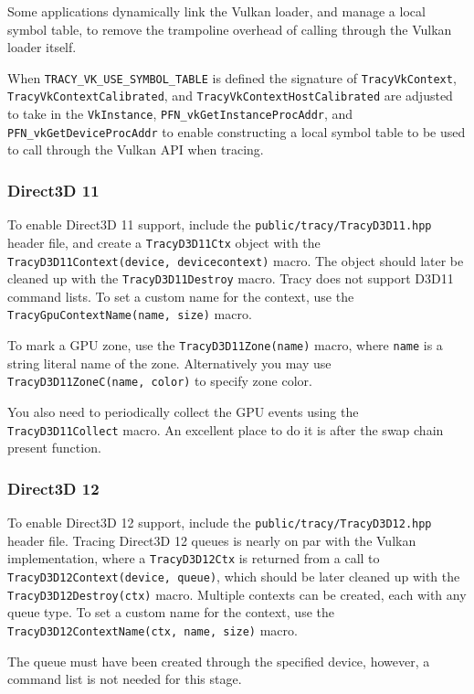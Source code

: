 \documentclass[hidelinks,titlepage,a4paper,twoside]{article}
\begin{document}
Some applications dynamically link the Vulkan loader, and manage a local symbol table, to remove the trampoline overhead of calling through the Vulkan loader itself.

When \texttt{TRACY\_VK\_USE\_SYMBOL\_TABLE} is defined the signature of \texttt{TracyVkContext}, \texttt{TracyVkContextCalibrated}, and \texttt{TracyVkContextHostCalibrated} are adjusted to take in the \texttt{VkInstance}, \texttt{PFN\_vkGetInstanceProcAddr}, and \texttt{PFN\_vkGetDeviceProcAddr} to enable constructing a local symbol table to be used to call through the Vulkan API when tracing.

\subsubsection{Direct3D 11}

To enable Direct3D 11 support, include the \texttt{public/tracy/TracyD3D11.hpp} header file, and create a \texttt{TracyD3D11Ctx} object with the \texttt{TracyD3D11Context(device, devicecontext)} macro. The object should later be cleaned up with the \texttt{TracyD3D11Destroy} macro. Tracy does not support D3D11 command lists. To set a custom name for the context, use the \texttt{TracyGpuContextName(name, size)} macro.

To mark a GPU zone, use the \texttt{TracyD3D11Zone(name)} macro, where \texttt{name} is a string literal name of the zone. Alternatively you may use \texttt{TracyD3D11ZoneC(name, color)} to specify zone color.

You also need to periodically collect the GPU events using the \texttt{TracyD3D11Collect} macro. An excellent place to do it is after the swap chain present function.

\subsubsection{Direct3D 12}

To enable Direct3D 12 support, include the \texttt{public/tracy/TracyD3D12.hpp} header file. Tracing Direct3D 12 queues is nearly on par with the Vulkan implementation, where a \texttt{TracyD3D12Ctx} is returned from a call to \texttt{TracyD3D12Context(device, queue)}, which should be later cleaned up with the \texttt{TracyD3D12Destroy(ctx)} macro. Multiple contexts can be created, each with any queue type. To set a custom name for the context, use the \texttt{TracyD3D12ContextName(ctx, name, size)} macro.

The queue must have been created through the specified device, however, a command list is not needed for this stage.
\end{document}
